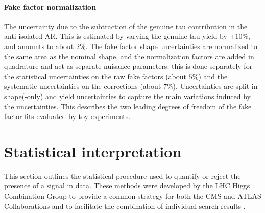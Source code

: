 \paragraph{Fake factor normalization} The uncertainty due to the subtraction of the genuine tau contribution in the anti-isolated AR. This is estimated by varying the genuine-tau yield by $\pm 10\%$, and amounts to about $2\%$. The fake factor shape uncertainties are normalized to the same area as the nominal shape, and the normalization factors are added in quadrature and act as separate nuisance parameters: this is done separately for the statistical uncertainties on the raw fake factors (about $5\%$) and the systematic uncertainties on the corrections (about $7\%$). Uncertainties are split in shape(-only) and yield uncertainties to capture the main variations induced by the uncertainties. This describes the two leading degrees of freedom of the fake factor \pt fits evaluated by toy experiments.

\section{Statistical interpretation}
\label{sec:analysis_statistical_interpretation}

This section outlines the statistical procedure used to quantify or reject the presence of a signal in data. These methods were developed by the LHC Higgs Combination Group to provide a common strategy for both the CMS and ATLAS Collaborations and to facilitate the combination of individual search results \cite{CMS-NOTE-2011-005}. 

